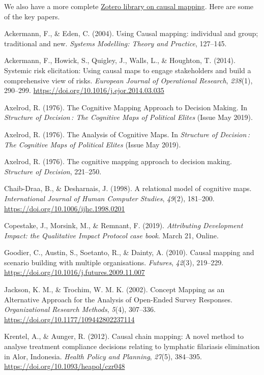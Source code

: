 \documentclass[
]{book}
\begin{document}
We also have a more complete \href{https://www.zotero.org/groups/2858107/causal-mapping/library}{Zotero library on causal mapping}. Here are some of the key papers.

Ackermann, F., \& Eden, C. (2004). Using Causal mapping: individual and group; traditional and new. \emph{Systems Modelling: Theory and Practice}, 127--145.

Ackermann, F., Howick, S., Quigley, J., Walls, L., \& Houghton, T. (2014). Systemic risk elicitation: Using causal maps to engage stakeholders and build a comprehensive view of risks. \emph{European Journal of Operational Research}, \emph{238}(1), 290--299. \url{https://doi.org/10.1016/j.ejor.2014.03.035}

Axelrod, R. (1976). The Cognitive Mapping Approach to Decision Making. In \emph{Structure of Decision\,: The Cognitive Maps of Political Elites} (Issue May 2019).

Axelrod, R. (1976). The Analysis of Cognitive Maps. In \emph{Structure of Decision\,: The Cognitive Maps of Political Elites} (Issue May 2019).

Axelrod, R. (1976). The cognitive mapping approach to decision making. \emph{Structure of Decision}, 221--250.

Chaib-Draa, B., \& Desharnais, J. (1998). A relational model of cognitive maps. \emph{International Journal of Human Computer Studies}, \emph{49}(2), 181--200. \url{https://doi.org/10.1006/ijhc.1998.0201}

Copestake, J., Morsink, M., \& Remnant, F. (2019). \emph{Attributing Development Impact: the Qualitative Impact Protocol case book}. March 21, Online.

Goodier, C., Austin, S., Soetanto, R., \& Dainty, A. (2010). Causal mapping and scenario building with multiple organisations. \emph{Futures}, \emph{42}(3), 219--229. \url{https://doi.org/10.1016/j.futures.2009.11.007}

Jackson, K. M., \& Trochim, W. M. K. (2002). Concept Mapping as an Alternative Approach for the Analysis of Open-Ended Survey Responses. \emph{Organizational Research Methods}, \emph{5}(4), 307--336. \url{https://doi.org/10.1177/109442802237114}

Krentel, A., \& Aunger, R. (2012). Causal chain mapping: A novel method to analyse treatment compliance decisions relating to lymphatic filariasis elimination in Alor, Indonesia. \emph{Health Policy and Planning}, \emph{27}(5), 384--395. \url{https://doi.org/10.1093/heapol/czr048}
\end{document}
